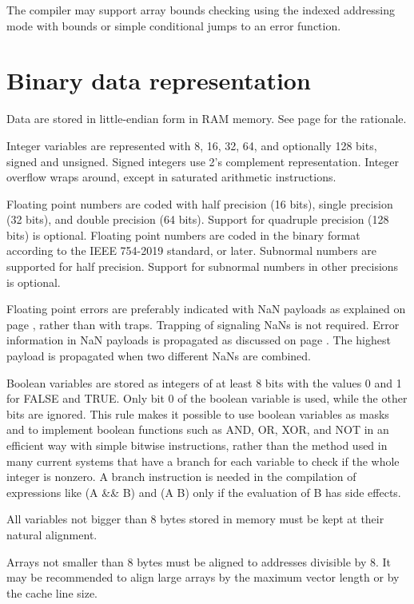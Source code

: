 \documentclass[forwardcom.tex]{subfiles}
\begin{document}
\vv
The compiler may support array bounds checking using the indexed addressing mode with bounds or simple conditional jumps to an error function. 

\section{Binary data representation} \label{binaryDataRepresentation}
Data are stored in little-endian form in RAM memory. See page \pageref{endianness} for the rationale. 
\vv

Integer variables are represented with 8, 16, 32, 64, and optionally 128 bits, signed and unsigned. Signed integers use 2's complement representation. Integer overflow wraps around, except in saturated arithmetic instructions. 
\vv

Floating point numbers are coded with half precision (16 bits), single precision (32 bits), and double precision (64 bits). Support for quadruple precision (128 bits) is optional. Floating point numbers are coded in the binary format according to the IEEE 754-2019 standard, or later. Subnormal numbers are supported for half precision. Support for subnormal numbers in other precisions is optional.
\vv

Floating point errors are preferably indicated with NaN payloads as explained on page \pageref{ADifferentWayOfTrackingErrors}, rather than with traps. Trapping of signaling NaNs is not required. Error information in NaN payloads is propagated as discussed on page \pageref{nanPropagation}. The highest payload is propagated when two different NaNs are combined.
\vv

\label{booleanRepresentation}
Boolean variables are stored as integers of at least 8 bits with the values 0 and 1 for FALSE and TRUE. Only bit 0 of the boolean variable is used, while the other bits are ignored. This rule makes it possible to use boolean variables as masks and to implement boolean functions such as AND, OR, XOR, and NOT in an efficient way with simple bitwise instructions, rather than the method used in many current systems that have a branch for each variable to check if the whole integer is nonzero. A branch instruction is needed in the compilation of expressions like (A \&\& B) and (A \textbar\textbar{} B) only if the evaluation of B has side effects. 
\vv

All variables not bigger than 8 bytes stored in memory must be kept at their natural alignment.
\vv

Arrays not smaller than 8 bytes must be aligned to addresses divisible by 8. It may be recommended to align large arrays by the maximum vector length or by the cache line size. 
\vv
\end{document}
